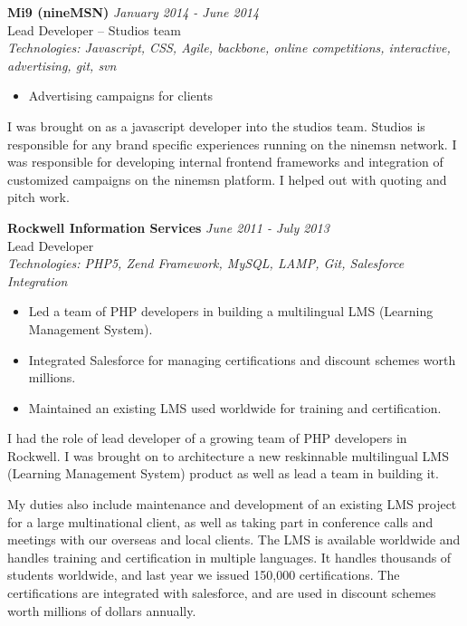 \documentclass[a4paper,10pt]{article}
\begin{document}
\vspace{1em}

\textbf{Mi9 (nineMSN)} \hfill \textit{January 2014 - June 2014} \\
Lead Developer – Studios team \\
\textit{Technologies: Javascript, CSS, Agile, backbone, online competitions, interactive, advertising, git, svn}
\begin{itemize}
    \item Advertising campaigns for clients
\end{itemize}

I was brought on as a javascript developer into the studios team. Studios is responsible for any brand specific experiences running on the ninemsn network. I was responsible for developing internal frontend frameworks and integration of customized campaigns on the ninemsn platform. I helped out with quoting and pitch work.

\vspace{1em}

\textbf{Rockwell Information Services} \hfill \textit{June 2011 - July 2013} \\
Lead Developer \\
\textit{Technologies: PHP5, Zend Framework, MySQL, LAMP, Git, Salesforce Integration}
\begin{itemize}
    \item Led a team of PHP developers in building a multilingual LMS (Learning Management System).
    \item Integrated Salesforce for managing certifications and discount schemes worth millions.
    \item Maintained an existing LMS used worldwide for training and certification.
\end{itemize}

I had the role of lead developer of a growing team of PHP developers in Rockwell. I was brought on to architecture a new reskinnable multilingual LMS (Learning Management System) product as well as lead a team in building it.

My duties also include maintenance and development of an existing LMS project for a large multinational client, as well as taking part in conference calls and meetings with our overseas and local clients. The LMS is available worldwide and handles training and certification in multiple languages. It handles thousands of students worldwide, and last year we issued 150,000 certifications. The certifications are integrated with salesforce, and are used in discount schemes worth millions of dollars annually.
\end{document}
